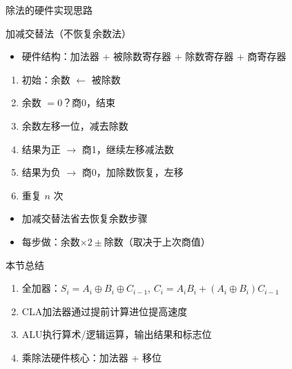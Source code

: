 \documentclass[10pt, aspectratio=169]{beamer}
\begin{document}
\begin{frame}{除法的硬件实现思路}
    \begin{block}{加减交替法（不恢复余数法）}
        \begin{itemize}
            \item 硬件结构：加法器 + 被除数寄存器 + 除数寄存器 + 商寄存器
        \end{itemize}
    \end{block}
    \vspace{0.3em}
    \begin{enumerate}
        \item 初始：余数 $\leftarrow$ 被除数
        \item 余数 $= 0$？商0，结束
        \item 余数左移一位，减去除数
        \item 结果为正 $\to$ 商1，继续左移减法数
        \item 结果为负 $\to$ 商0，加除数恢复，左移
        \item 重复 $n$ 次
    \end{enumerate}
    \vspace{0.3em}
    \begin{itemize}
        \item 加减交替法省去恢复余数步骤
        \item 每步做：余数$\times 2 \pm$除数（取决于上次商值）
    \end{itemize}
\end{frame}

\begin{frame}{本节总结}
    \begin{enumerate}
        \item 全加器：$S_i = A_i \oplus B_i \oplus C_{i-1}$, $C_i = A_iB_i + (A_i\oplus B_i)C_{i-1}$
        \item CLA加法器通过提前计算进位提高速度
        \item ALU执行算术/逻辑运算，输出结果和标志位
        \item 乘除法硬件核心：加法器 + 移位
    \end{enumerate}
\end{frame}
\end{document}
